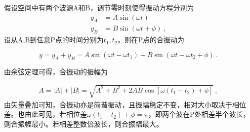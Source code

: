 假设空间中有两个波源A和B，调节零时刻使得振动方程分别为
\begin{equation}
\begin{aligned}
y_A&=A\sin(\omega t)\\
y_B&=B\sin (\omega t+\phi)~,
\end{aligned}
\end{equation}
设从A,B到任意P点的时间分别为$t_1,t_2$，则在P点的合振动为

\begin{equation}
y=y_A+y_B=A\sin(\omega t-\omega t_1)+B\sin(\omega t-\omega t_2+\phi)~.
\end{equation}



由余弦定理可得，合振动的振幅为

\begin{equation}
\begin{aligned}
A=|A|+|B|=\sqrt{A^2+B^2+2AB\cos[\omega(t_1-t_2)+\phi]}~,
\end{aligned}
\end{equation}
由矢量叠加可知，合振动亦是简谐振动，且振幅稳定不变，相对大小取决于相位差。也由此可见，若相位差$\omega(t_1-t_2)+\phi=\pi$，即两个波在P处相差半个波长，则合振幅最小。若相差整数倍波长，则合振幅最大。